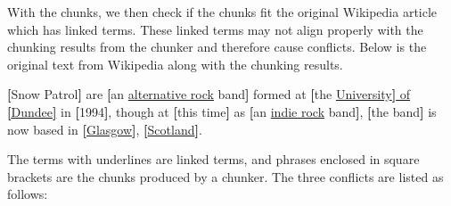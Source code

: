 With the chunks, we then check if the chunks fit
the original Wikipedia article which has linked terms.
These linked terms may not align properly with
the chunking results from the chunker and therefore cause conflicts.
Below is the original text from Wikipedia along with the chunking
results.
\begin{example}
\label{ex:snow-links}
{\textbf{[}Snow Patrol\textbf{]}} are
{\textbf{[}an {\uline{alternative rock}} band\textbf{]}}
formed at {\textbf{[}the {\uline{University{\color{black}\textbf{]}} of {\color{black}\textbf{[}}Dundee{\color{black}\textbf{]}}}}} in {\textbf{[}1994\textbf{]}}, though at {\textbf{[}this time\textbf{]}} as {\textbf{[}an {\uline{indie rock}} band\textbf{]}}, {\textbf{[}the band\textbf{]}} is now based in {\textbf{[}{\uline{Glasgow}}\textbf{]}}, {\textbf{[}{\uline{Scotland}}\textbf{]}}.
\end{example}
The terms with underlines are linked terms, and phrases enclosed in
square brackets are the chunks produced by a chunker. The three
conflicts are listed as follows:
